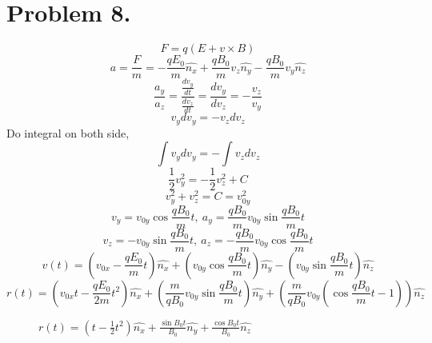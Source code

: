 \documentclass{article}
\begin{document}
\section*{Problem 8.}
	$$F=q(E+v\times B)$$
	$$a=\frac{F}{m}=-\frac{qE_0}{m}\hat{n_x}+\frac{qB_0}{m}v_z\hat{n_y}-\frac{qB_0}{m}v_y\hat{n_z}$$
	$$\frac{a_y}{a_z}=\frac{\frac{dv_y}{dt}}{\frac{dv_z}{dt}}=\frac{dv_y}{dv_z}=-\frac{v_z}{v_y}$$
	$$v_ydv_y=-v_zdv_z$$
	Do integral on both side,
	$$\int v_ydv_y=-\int v_zdv_z$$
	$$\frac{1}{2}v_y^2=-\frac{1}{2}v_z^2+C$$
	$$v_y^2+v_z^2=C=v_{0y}^2$$
	$$v_y=v_{0y}\cos\frac{qB_0}{m}t,\ a_y=\frac{qB_0}{m}v_{0y}\sin\frac{qB_0}{m}t$$
	$$v_z=-v_{0y}\sin\frac{qB_0}{m}t,\ a_z=-\frac{qB_0}{m}v_{0y}\cos\frac{qB_0}{m}t$$
	$$v(t)=\left(v_{0x}-\frac{qE_0}{m}t\right)\hat{n_x}+
	\left(v_{0y}\cos\frac{qB_0}{m}t\right)\hat{n_y}-
	\left(v_{0y}\sin\frac{qB_0}{m}t\right)\hat{n_z}$$
	$$r(t)=\left(v_{0x}t-\frac{qE_0}{2m}t^2\right)\hat{n_x}+
	\left(\frac{m}{qB_0}v_{0y}\sin\frac{qB_0}{m}t\right)\hat{n_y}+
	\left(\frac{m}{qB_0}v_{0y}(\cos\frac{qB_0}{m}t-1)\right)\hat{n_z}$$
	\begin{figure}[h!]
		\centering				
		\caption{$r(t)=(t-\frac{1}{2}t^2)\hat{n_x}+\frac{\sin B_0t}{B_0}\hat{n_y}+\frac{\cos B_0t}{B_0}\hat{n_z}$}
		\label{fig-sample}
	\end{figure}
\end{document}
